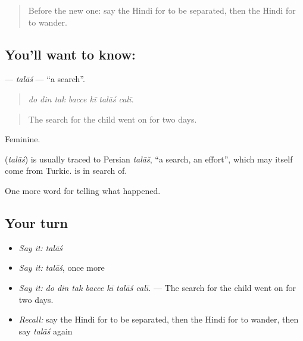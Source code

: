 \label{lesson:HI-C310-talas}



\begin{quote}
Before the new one: say the Hindi for to be separated, then the Hindi for to wander.
\end{quote}

\subsection*{You'll want to know: }
\textbf{} — \emph{talāś} — \textquotedblleft{}a search\textquotedblright{}.

\begin{quote}
      
\end{quote}

\begin{quote}
\emph{do din tak bacce kī talāś calī.}
\end{quote}

\begin{quote}
The search for the child went on for two days.
\end{quote}

Feminine.

\begin{cousinweb}
\textbf{} (\emph{talāś}) is usually traced to Persian \emph{talāš}, \textquotedblleft{}a search, an effort\textquotedblright{}, which may itself come from Turkic. \textbf{  } is in search of.
\end{cousinweb}

\begin{grammarlens}[title={What you've built}]
One more word for telling what happened.
\end{grammarlens}

\subsection*{Your turn}
\begin{itemize}
\raggedright
  \item \emph{Say it:} \emph{talāś}
  \item \emph{Say it:} \emph{talāś}, once more
  \item \emph{Say it:} \emph{do din tak bacce kī talāś calī.} — The search for the child went on for two days.
  \item \emph{Recall:} say the Hindi for to be separated, then the Hindi for to wander, then say \emph{talāś} again
\end{itemize}

